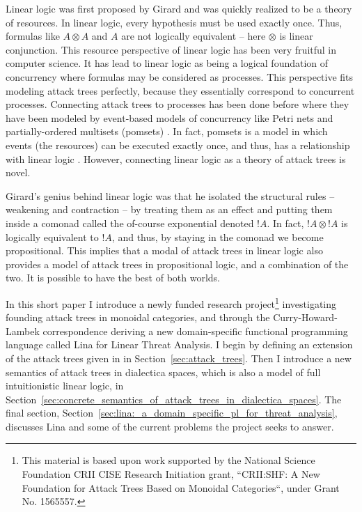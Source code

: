 \documentclass{llncs}
\begin{document}
Linear logic was first proposed by Girard \cite{Girard:1987} and was
quickly realized to be a theory of resources.  In linear logic, every
hypothesis must be used exactly once.  Thus, formulas like $A \otimes
A$ and $A$ are not logically equivalent -- here $\otimes$ is linear
conjunction.  This resource perspective of linear logic has been very
fruitful in computer science.  It has lead to linear logic as being a
logical foundation of concurrency where formulas may be considered as
processes.  This perspective fits modeling attack trees perfectly,
because they essentially correspond to concurrent processes.
Connecting attack trees to processes has been done before where they
have been modeled by event-based models of concurrency like Petri nets
and partially-ordered multisets (pomsets)
\cite{Jhawar:2015,Mauw:2006}.  In fact, pomsets is a model in which
events (the resources) can be executed exactly once, and thus, has a
relationship with linear logic \cite{Retore:1997}.  However,
connecting linear logic as a theory of attack trees is novel.

Girard's genius behind linear logic was that he isolated the
structural rules -- weakening and contraction -- by treating them as
an effect and putting them inside a comonad called the of-course
exponential denoted $!A$.  In fact, $!A \otimes !A$ is logically
equivalent to $!A$, and thus, by staying in the comonad we become
propositional.  This implies that a modal of attack trees in linear
logic also provides a model of attack trees in propositional logic,
and a combination of the two.  It is possible to have the best of both
worlds.

In this short paper I introduce a newly funded research
project\footnote{This material is based upon work supported by the
  National Science Foundation CRII CISE Research Initiation grant,
  ``CRII:SHF: A New Foundation for Attack Trees Based on Monoidal
  Categories``, under Grant No. 1565557.}  investigating founding
attack trees in monoidal categories, and through the
Curry-Howard-Lambek correspondence deriving a new domain-specific
functional programming language called Lina for Linear Threat
Analysis.  I begin by defining an extension of the attack trees given
in \cite{Jhawar:2015} in Section~\ref{sec:attack_trees}.  Then I
introduce a new semantics of attack trees in dialectica spaces, which
is also a model of full intuitionistic linear logic, in
Section~\ref{sec:concrete_semantics_of_attack_trees_in_dialectica_spaces}.
The final section,
Section~\ref{sec:lina:_a_domain_specific_pl_for_threat_analysis},
discusses Lina and some of the current problems the project seeks to
answer.
\end{document}
